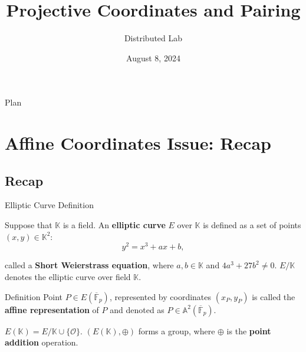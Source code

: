 \documentclass{zkdl-presentation-template}
\title[Projective Space and Pairing]{\textbf{Projective Coordinates and Pairing}}
\author{Distributed Lab}
\date{August 8, 2024}
\begin{document}
 
	\begin{frame}{Plan}
        \tableofcontents
    \end{frame}

	\section{Affine Coordinates Issue: Recap}

    \subsection{Recap}
    \begin{frame}{Elliptic Curve Definition}
        \begin{definition}
            Suppose that $\mathbb{K}$ is a field. An \textbf{elliptic curve} $E$ over $\mathbb{K}$ is defined as a set of points $(x,y) \in \mathbb{K}^2$:
            \vspace{-5pt}
            \begin{equation*}
                y^2 = x^3+ax+b,
            \end{equation*}
            \vspace{-20pt}

            called a \textbf{Short Weierstrass equation}, where $a,b \in \mathbb{K}$ and $4a^3+27b^2 \neq 0$. $E/\mathbb{K}$ denotes the elliptic curve over field $\mathbb{K}$.
        \end{definition}

        \begin{block}{Definition}
            Point $P \in E(\overline{\mathbb{F}}_p)$, represented by coordinates $(x_P,y_P)$ is called the \textbf{affine representation} of $P$ and denoted as $P \in \mathbb{A}^2(\overline{\mathbb{F}}_p)$.
        \end{block}

        \begin{definition}
            $E(\mathbb{K}) = E/\mathbb{K} \cup \{\mathcal{O}\}$. $(E(\mathbb{K}), \oplus)$ forms a group, where $\oplus$ is the \textbf{point addition} operation.
        \end{definition}
    \end{frame}
\end{document}
